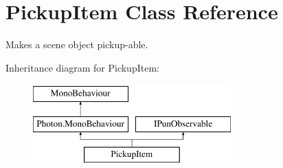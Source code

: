 \hypertarget{class_pickup_item}{}\section{Pickup\+Item Class Reference}
\label{class_pickup_item}


Makes a scene object pickup-\/able.  


Inheritance diagram for Pickup\+Item\+:\begin{figure}[H]
\begin{center}
\leavevmode
\includegraphics[height=3.000000cm]{class_pickup_item}
\end{center}
\end{figure}
